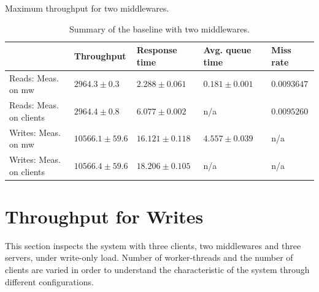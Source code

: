 \documentclass[11pt,a4paper]{article}
\begin{document}
\begin{table}[h]
\centering
{Maximum throughput for two middlewares.}
\begin{tabular}{|l|p{2.3cm}|p{2.3cm}|p{2.7cm}|p{2.3cm}|}
\hline                      & Throughput         & {\small Response time}      & {\small Avg. queue time} & Miss rate \\ 
\hline Reads: Meas. on mw       & $2964.3 \pm 0.3$   & $2.288 \pm 0.061$  & $0.181 \pm 0.001$  & $0.0093647$ \\ 
\hline Reads: Meas. on clients  & $2964.4 \pm 0.8$   & $6.077 \pm 0.002$  & n/a                & $0.0095260$ \\ 
\hline Writes: Meas. on mw      & $10566.1 \pm 59.6$ & $16.121 \pm 0.118$ & $4.557 \pm 0.039$  & n/a     \\ 
\hline Writes: Meas. on clients & $10566.4 \pm 59.6$ & $18.206 \pm 0.105$ & n/a                & n/a     \\ 
\hline 
\end{tabular}
\caption{Summary of the baseline with two middlewares.} \label{tab:mwb2-summary}
\end{table}

\section{Throughput for Writes} \label{sec:tpfw}
This section inspects the system with three clients, two middlewares and three servers, under write-only load. Number of worker-threads and the number of clients are varied in order to understand the characteristic of the system through different configurations.
\end{document}
